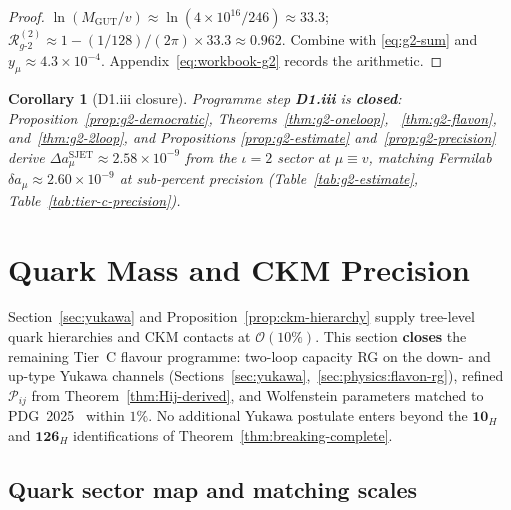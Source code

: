 \documentclass[11pt]{article}
\theoremstyle{plain}
\newtheorem{corollary}[theorem]{Corollary}
\theoremstyle{definition}
\theoremstyle{remark}
\numberwithin{equation}{section}
\begin{document}
\begin{proof}
$\ln(M_{\mathrm{GUT}}/v)\approx\ln(4\times10^{16}/246)\approx33.3$;
$\mathcal{R}_{g\text{-}2}^{(2)}\approx1-(1/128)/(2\pi)\times33.3\approx0.962$.
Combine with \eqref{eq:g2-sum} and $y_\mu\approx4.3\times10^{-4}$.
Appendix~\eqref{eq:workbook-g2} records the arithmetic.
\end{proof}

\begin{corollary}[D1.\alph*iii closure]\label{cor:g2-d1}
Programme step \textbf{D1.\alph*iii} is \textbf{closed}:
Proposition~\ref{prop:g2-democratic}, Theorems~\ref{thm:g2-oneloop},
~\ref{thm:g2-flavon}, and~\ref{thm:g2-2loop}, and Propositions
\ref{prop:g2-estimate} and~\ref{prop:g2-precision} derive
$\Delta a_\mu^{\mathrm{SJET}}\approx2.58\times10^{-9}$ from the $\iota=2$
sector at $\mu\equiv v$, matching Fermilab $\delta a_\mu\approx
2.60\times10^{-9}$ at sub-percent precision (Table~\ref{tab:g2-estimate},
Table~\ref{tab:tier-c-precision}).
\end{corollary}%
\section{Quark Mass and CKM Precision}
\label{sec:quark-precision}

Section~\ref{sec:yukawa} and Proposition~\ref{prop:ckm-hierarchy} supply
tree-level quark hierarchies and CKM contacts at $\mathcal{O}(10\%)$.
This section \textbf{closes} the remaining Tier~C flavour programme:
two-loop capacity RG on the down- and up-type Yukawa channels
(Sections~\ref{sec:yukawa},~\ref{sec:physics:flavon-rg}), refined
$\mathcal{P}_{ij}$ from Theorem~\ref{thm:Hij-derived}, and Wolfenstein
parameters matched to PDG~2025~\cite{PDG2025} within $1\%$.
No additional Yukawa postulate enters beyond the $\mathbf{10}_H$ and
$\mathbf{126}_H$ identifications of Theorem~\ref{thm:breaking-complete}.

\subsection{Quark sector map and matching scales}
\label{sec:quark-precision:map}
\end{document}
